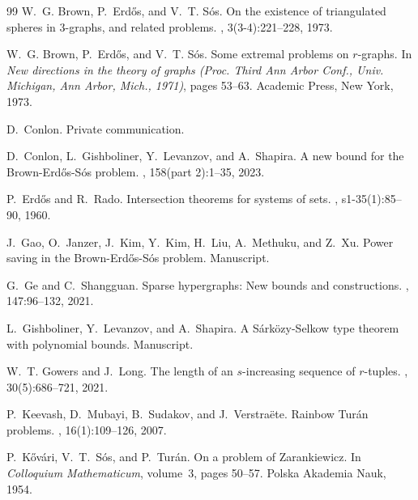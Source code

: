 \documentclass[11pt]{article}
\numberwithin{equation}{section}
\theoremstyle{plain}
\theoremstyle{remark}
\begin{document}
\begin{thebibliography}{99}
W.~G. Brown, P.~Erd\H{o}s, and V.~T. S\'{o}s.
\newblock On the existence of triangulated spheres in {$3$}-graphs, and related
  problems.
, 3(3-4):221--228, 1973.

W.~G. Brown, P.~Erd\H{o}s, and V.~T. S\'{o}s.
\newblock Some extremal problems on {$r$}-graphs.
\newblock In {\em New directions in the theory of graphs ({P}roc. {T}hird {A}nn
  {A}rbor {C}onf., {U}niv. {M}ichigan, {A}nn {A}rbor, {M}ich., 1971)}, pages
  53--63. Academic Press, New York, 1973.

D.~Conlon.
\newblock Private communication.

D.~Conlon, L.~Gishboliner, Y.~Levanzov, and A.~Shapira.
\newblock A new bound for the {B}rown-{E}rd{\H{o}}s-{S}\'{o}s problem.
, 158(part 2):1--35, 2023.

P.~Erd{\H{o}}s and R.~Rado.
\newblock Intersection theorems for systems of sets.
, s1-35(1):85--90,
  1960.

J.~Gao, O.~Janzer, J.~Kim, Y.~Kim, H.~Liu, A.~Methuku, and Z.~Xu.
\newblock Power saving in the {Brown}-{Erd\H{o}s}-{S\'os} problem.
\newblock Manuscript.

G.~Ge and C.~Shangguan.
\newblock Sparse hypergraphs: New bounds and constructions.
, 147:96--132, 2021.

L.~Gishboliner, Y.~Levanzov, and A.~Shapira.
\newblock A {S}\'ark\"ozy-{S}elkow type theorem with polynomial bounds.
\newblock Manuscript.

W.~T. Gowers and J.~Long.
\newblock The length of an {$s$}-increasing sequence of {$r$}-tuples.
, 30(5):686--721, 2021.

P.~Keevash, D.~Mubayi, B.~Sudakov, and J.~Verstra{\"e}te.
\newblock Rainbow {Tur{\'a}n} problems.
, 16(1):109--126, 2007.

P.~K{\H{o}}v{\'a}ri, V.~T.~S{\'o}s, and P.~Tur{\'a}n.
\newblock On a problem of {Z}arankiewicz.
\newblock In {\em Colloquium Mathematicum}, volume~3, pages 50--57. Polska
  Akademia Nauk, 1954.


\end{thebibliography}
\end{document}
